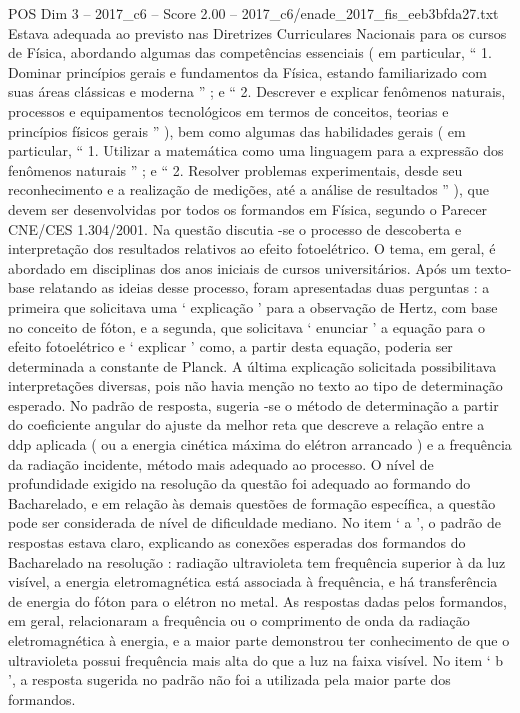 \begin{textsample}{POS Dim 3 – 2017\_c6 – Score 2.00 – 2017\_c6/enade\_2017\_fis\_eeb3bfda27.txt}
Estava adequada ao previsto nas Diretrizes Curriculares Nacionais para os cursos de Física, abordando algumas das competências essenciais ( em particular, “ 1.
Dominar princípios gerais e fundamentos da Física, estando familiarizado com suas áreas clássicas e moderna ” ; e “ 2.
Descrever e explicar fenômenos naturais, processos e equipamentos tecnológicos em termos de conceitos, teorias e princípios físicos gerais ” ), bem como algumas das habilidades gerais ( em particular, “ 1.
Utilizar a matemática como uma linguagem para a expressão dos fenômenos naturais ” ; e “ 2.
Resolver problemas experimentais, desde seu reconhecimento e a realização de medições, até a análise de resultados ” ), que devem ser desenvolvidas por todos os formandos em Física, segundo o Parecer CNE/CES 1.304/2001.
Na questão discutia -se o processo de descoberta e interpretação dos resultados relativos ao efeito fotoelétrico.
O tema, em geral, é abordado em disciplinas dos anos iniciais de cursos universitários.
Após um texto-base relatando as ideias desse processo, foram apresentadas duas perguntas : a primeira que solicitava uma ‘ explicação ’ para a observação de Hertz, com base no conceito de fóton, e a segunda, que solicitava ‘ enunciar ’ a equação para o efeito fotoelétrico e ‘ explicar ’ como, a partir desta equação, poderia ser determinada a constante de Planck.
A última explicação solicitada possibilitava interpretações diversas, pois não havia menção no texto ao tipo de determinação esperado.
No padrão de resposta, sugeria -se o método de determinação a partir do coeficiente angular do ajuste da melhor reta que descreve a relação entre a ddp aplicada ( ou a energia cinética máxima do elétron arrancado ) e a frequência da radiação incidente, método mais adequado ao processo.
O nível de profundidade exigido na resolução da questão foi adequado ao formando do Bacharelado, e em relação às demais questões de formação específica, a questão pode ser considerada de nível de dificuldade mediano.
No item ‘ a ’, o padrão de respostas estava claro, explicando as conexões esperadas dos formandos do Bacharelado na resolução : radiação ultravioleta tem frequência superior à da luz visível, a energia eletromagnética está associada à frequência, e há transferência de energia do fóton para o elétron no metal.
As respostas dadas pelos formandos, em geral, relacionaram a frequência ou o comprimento de onda da radiação eletromagnética à energia, e a maior parte demonstrou ter conhecimento de que o ultravioleta possui frequência mais alta do que a luz na faixa visível.
No item ‘ b ’, a resposta sugerida no padrão não foi a utilizada pela maior parte dos formandos.

\end{textsample}
